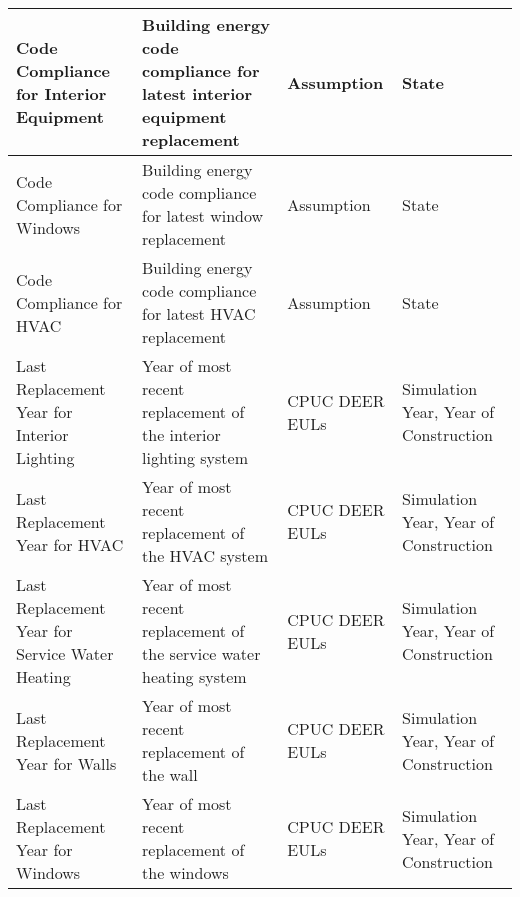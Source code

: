\begin{center}
\begin{longtable}{|p{1.3in}|p{1.5in}|p{1.5in}|p{1.5in}|}
Code Compliance for Interior Equipment                          & Building energy code compliance for latest interior equipment replacement      & Assumption                                                  & State                                                                                                \\ \hline
Code Compliance for Windows                                     & Building energy code compliance for latest window replacement                  & Assumption                                                  & State                                                                                                \\ \hline
Code Compliance for HVAC                                        & Building energy code compliance for latest HVAC replacement                    & Assumption                                                  & State                                                                                                \\ \hline
Last Replacement Year for Interior Lighting                     & Year of most recent replacement of the interior lighting system                & CPUC DEER EULs                                              & Simulation Year, Year of Construction                                                                \\ \hline
Last Replacement Year for HVAC                                  & Year of most recent replacement of the HVAC system                             & CPUC DEER EULs                                              & Simulation Year, Year of Construction                                                                \\ \hline
Last Replacement Year for Service Water Heating                 & Year of most recent replacement of the service water heating system            & CPUC DEER EULs                                              & Simulation Year, Year of Construction                                                                \\ \hline
Last Replacement Year for Walls                                 & Year of most recent replacement of the wall                                    & CPUC DEER EULs                                              & Simulation Year, Year of Construction                                                                \\ \hline
Last Replacement Year for Windows                               & Year of most recent replacement of the windows                                 & CPUC DEER EULs                                              & Simulation Year, Year of Construction                                                                \\ \hline

\end{longtable}
\end{center}
